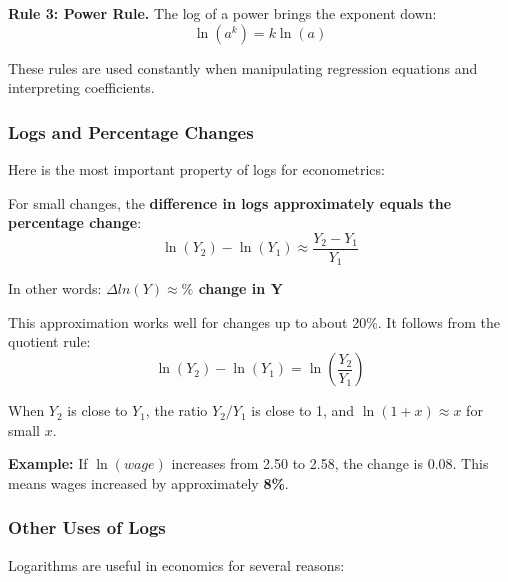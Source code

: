 \documentclass[
  letterpaper,
  DIV=11,
  numbers=noendperiod]{scrreprt}
\begin{document}
\textbf{Rule 3: Power Rule.} The log of a power brings the exponent
down: \[\ln(a^k) = k \ln(a)\]

These rules are used constantly when manipulating regression equations
and interpreting coefficients.

\subsubsection{Logs and Percentage
Changes}\label{logs-and-percentage-changes}

Here is the most important property of logs for econometrics:

\begin{tcolorbox}[enhanced jigsaw, arc=.35mm, bottomrule=.15mm, bottomtitle=1mm, breakable, colback=white, colbacktitle=quarto-callout-important-color!10!white, colframe=quarto-callout-important-color-frame, coltitle=black, left=2mm, leftrule=.75mm, opacityback=0, opacitybacktitle=0.6, rightrule=.15mm, title=\textcolor{quarto-callout-important-color}{\faExclamation}\hspace{0.5em}{The Key Insight}, titlerule=0mm, toprule=.15mm, toptitle=1mm]

For small changes, the \textbf{difference in logs approximately equals
the percentage change}:
\[\ln(Y_2) - \ln(Y_1) \approx \frac{Y_2 - Y_1}{Y_1}\]

In other words: \textbf{\(\Delta ln(Y) \approx \%\) change in Y}

\end{tcolorbox}

This approximation works well for changes up to about 20\%. It follows
from the quotient rule:
\[\ln(Y_2) - \ln(Y_1) = \ln\left(\frac{Y_2}{Y_1}\right)\]

When \(Y_2\) is close to \(Y_1\), the ratio \(Y_2/Y_1\) is close to 1,
and \(\ln(1 + x) \approx x\) for small \(x\).

\textbf{Example:} If \(\ln(wage)\) increases from 2.50 to 2.58, the
change is \(0.08\). This means wages increased by approximately
\textbf{8\%}.

\subsubsection{Other Uses of Logs}\label{other-uses-of-logs}

Logarithms are useful in economics for several reasons:
\end{document}
